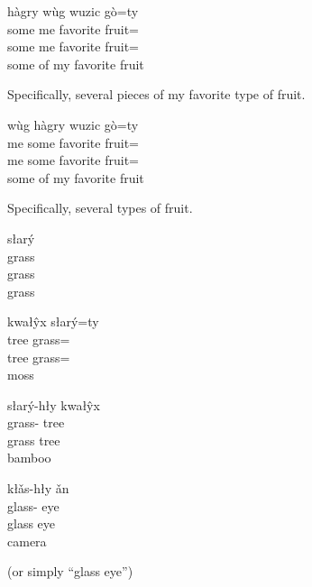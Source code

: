 \documentclass[12pt]{article}
\begin{document}
    \begin{exe}
        \ex
        \glll
        hàgry wùg wuzic gò=ty \\
        some me favorite fruit=\Poss{} \\
        some me favorite fruit=\Poss{} \\
        \glt
        some of my favorite fruit
    \end{exe}
    Specifically, several pieces of my favorite type of fruit.

    \begin{exe}
        \ex
        \glll
        wùg hàgry wuzic gò=ty \\
        me some favorite fruit=\Poss{} \\
        me some favorite fruit=\Poss{} \\
        \glt
        some of my favorite fruit
    \end{exe}
    Specifically, several types of fruit.

    \begin{exe}
        \ex
        \glll
        słarý \\
        grass \\
        grass \\
        \glt
        grass
    \end{exe}

    \begin{exe}
        \ex
        \glll
        kwałŷx słarý=ty \\
        tree grass=\Poss{} \\
        tree grass=\Poss{} \\
        \glt
        moss
    \end{exe}

    \begin{exe}
        \ex
        \glll
        słarý-hły kwałŷx \\
        grass-\Adj{} tree \\
        grass tree \\
        \glt
        bamboo
    \end{exe}

    \begin{exe}
        \ex
        \glll
        kłǎs-hły ǎn \\
        glass-\Adj{} eye \\
        glass eye \\
        \glt
        camera
    \end{exe}
    (or simply ``glass eye'')
\end{document}
